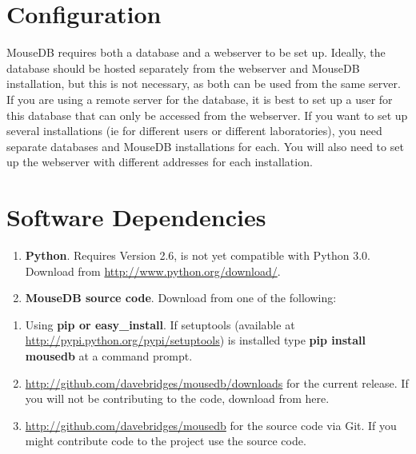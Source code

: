 \documentclass[letterpaper,10pt,english]{sphinxmanual}
\begin{document}
\section{Configuration}
\label{installation:configuration}
MouseDB requires both a database and a webserver to be set up.  Ideally, the database should be hosted separately from the webserver and MouseDB installation, but this is not necessary, as both can be used from the same server.  If you are using a remote server for the database, it is best to set up a user for this database that can only be accessed from the webserver.  If you want to set up several installations (ie for different users or different laboratories), you need separate databases and MouseDB installations for each.  You will also need to set up the webserver with different addresses for each installation.



\section{Software Dependencies}
\label{installation:software-dependencies}\begin{enumerate}
\item {} 
\textbf{Python}.  Requires Version 2.6, is not yet compatible with Python 3.0.  Download from \href{http://www.python.org/download/}{http://www.python.org/download/}.


\item {} 
\textbf{MouseDB source code}.  Download from one of the following:


\end{enumerate}
\begin{enumerate}
\item {} 
Using \textbf{pip or easy\_install}.  If setuptools (available at \href{http://pypi.python.org/pypi/setuptools}{http://pypi.python.org/pypi/setuptools}) is installed type \textbf{pip install mousedb} at a command prompt.


\item {} 
\href{http://github.com/davebridges/mousedb/downloads}{http://github.com/davebridges/mousedb/downloads} for the current release.  If you will not be contributing to the code, download from here.


\item {} 
\href{http://github.com/davebridges/mousedb}{http://github.com/davebridges/mousedb} for the source code via Git.  If you might contribute code to the project use the source code.


\end{enumerate}
\end{document}

